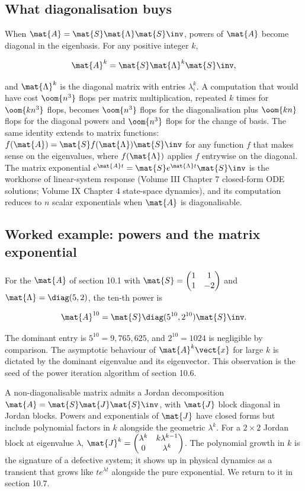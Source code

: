 \subsection{What diagonalisation buys}

When $\mat{A} = \mat{S} \mat{\Lambda} \mat{S}\inv$, powers of
$\mat{A}$ become diagonal in the eigenbasis. For any positive
integer $k$,

\[
\mat{A}^{k} = \mat{S} \mat{\Lambda}^{k} \mat{S}\inv,
\]

and $\mat{\Lambda}^{k}$ is the diagonal matrix with entries
$\lambda_{i}^{k}$. A computation that would have cost $\oom{n^{3}}$
flops per matrix multiplication, repeated $k$ times for $\oom{k
n^{3}}$ flops, becomes $\oom{n^{3}}$ flops for the diagonalisation
plus $\oom{k n}$ flops for the diagonal powers and $\oom{n^{3}}$
flops for the change of basis. The same identity extends to matrix
functions: $f(\mat{A}) = \mat{S} f(\mat{\Lambda}) \mat{S}\inv$ for
any function $f$ that makes sense on the eigenvalues, where
$f(\mat{\Lambda})$ applies $f$ entrywise on the diagonal. The
matrix exponential $e^{\mat{A} t} = \mat{S} e^{\mat{\Lambda} t}
\mat{S}\inv$ is the workhorse of linear-system response (Volume III
Chapter 7 closed-form ODE solutions; Volume IX Chapter 4
state-space dynamics), and its computation reduces to $n$ scalar
exponentials when $\mat{A}$ is diagonalisable.

\subsection{Worked example: powers and the matrix exponential}

For the $\mat{A}$ of section 10.1 with $\mat{S} = \begin{pmatrix} 1
& 1 \\ 1 & -2 \end{pmatrix}$ and $\mat{\Lambda} = \diag(5, 2)$, the
ten-th power is

\[
\mat{A}^{10} = \mat{S} \diag(5^{10}, 2^{10}) \mat{S}\inv.
\]

The dominant entry is $5^{10} = 9{,}765{,}625$, and $2^{10} = 1024$
is negligible by comparison. The asymptotic behaviour of $\mat{A}^{k}
\vect{x}$ for large $k$ is dictated by the dominant eigenvalue and
its eigenvector. This observation is the seed of the power iteration
algorithm of section 10.6.

\begin{mastery}
A non-diagonalisable matrix admits a Jordan decomposition $\mat{A} =
\mat{S} \mat{J} \mat{S}\inv$, with $\mat{J}$ block diagonal in
Jordan blocks. Powers and exponentials of $\mat{J}$ have closed
forms but include polynomial factors in $k$ alongside the geometric
$\lambda^{k}$. For a $2 \times 2$ Jordan block at eigenvalue
$\lambda$, $\mat{J}^{k} = \begin{pmatrix} \lambda^{k} & k \lambda^{k-1}
\\ 0 & \lambda^{k} \end{pmatrix}$. The polynomial growth in $k$ is
the signature of a defective system; it shows up in physical
dynamics as a transient that grows like $t e^{\lambda t}$ alongside
the pure exponential. We return to it in section 10.7.
\end{mastery}

